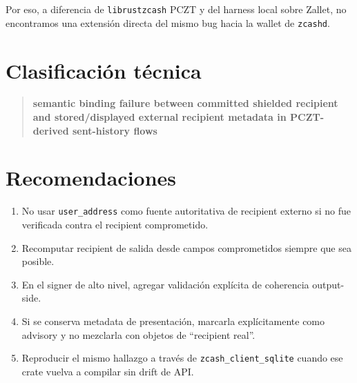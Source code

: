 \documentclass[11pt,a4paper]{article}
\begin{document}
Por eso, a diferencia de \texttt{librustzcash} PCZT y del harness local sobre
Zallet, no encontramos una extensión directa del mismo bug hacia la wallet de
\texttt{zcashd}.

\section{Clasificación técnica}

\begin{quote}
\textbf{semantic binding failure between committed shielded recipient and stored/displayed external recipient metadata in PCZT-derived sent-history flows}
\end{quote}

\section{Recomendaciones}

\begin{enumerate}[leftmargin=2em]
    \item No usar \texttt{user\_address} como fuente autoritativa de recipient externo si no fue verificada contra el recipient comprometido.
    \item Recomputar recipient de salida desde campos comprometidos siempre que sea posible.
    \item En el signer de alto nivel, agregar validación explícita de coherencia output-side.
    \item Si se conserva metadata de presentación, marcarla explícitamente como advisory y no mezclarla con objetos de ``recipient real''.
    \item Reproducir el mismo hallazgo a través de \texttt{zcash\_client\_sqlite} cuando ese crate vuelva a compilar sin drift de API.
\end{enumerate}
\end{document}
